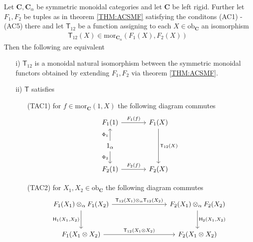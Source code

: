 \begin{thm}
\label{thm:appacmnt}
Let $\mathbf{C}, \mathbf{C}_{\alpha}$ be symmetric monoidal categories and let $\mathbf{C}$ be left rigid. Further let $F_{1},F_{2}$ be tuples as in theorem \ref{THM:ACSMF} satisfying the conditons (AC1) - (AC5) there and let $\mathsf{T}_{12}$ be a function assigning to each $X \in \mathrm{ob}_{\mathbf{C}}$ an isomorphism
\begin{align*}
  \mathsf{T}_{12}(X)
  \in
  \mathrm{mor}_{\mathbf{C}_{\alpha}}(F_{1}(X),F_{2}(X))
\end{align*}
Then the following are equivalent
\begin{enumerate}
\item[i)]
$\mathsf{T}_{12}$ is a monoidal natural isomorphism between the symmetric monoidal functors obtained by extending $F_{1},F_{2}$ via theorem \ref{THM:ACSMF}.

\item[ii)]
$\mathsf{T}$ satisfies
\begin{enumerate}
\item[(TAC1)]
for $f \in \mathrm{mor}_{\mathbf{C}}(1,X)$ the following diagram commutes
\begin{equation*}
\begin{tikzcd}[column sep=large]
  F_{1}(1)
  \ar{r}{F_{1}(f)}
  &
  F_{1}(X)
  \ar{dd}{\mathsf{T}_{12}(X)}
  \\
  1_{\alpha}
  \ar{u}{\Phi_{1}}
  \ar{d}[swap]{\Phi_{2}}
  \\
  F_{2}(1)
  \ar{r}{F_{2}(f)}
  &
  F_{2}(X)
\end{tikzcd}
\end{equation*}

\item[(TAC2)]
for $X_{1},X_{2} \in \mathrm{ob}_{\mathbf{C}}$ the following diagram commutes
\begin{equation*}
\begin{tikzcd}[row sep=large,column sep=8em]
  F_{1}(X_{1})
  \otimes_{\alpha}
  F_{1}(X_{2})
  \arrow{r}{\mathsf{T}_{12}(X_{1}) \otimes_{\alpha} \mathsf{T}_{12}(X_{2})}
  \arrow[swap]{d}{\mathsf{H}_{1}(X_{1},X_{2})}
  &
  F_{2}(X_{1})
  \otimes_{\alpha}
  F_{2}(X_{2})
  \arrow{d}{\mathsf{H}_{2}(X_{1},X_{2})}
  \\
  F_{1}(X_{1} \otimes X_{2})
  \arrow{r}{\mathsf{T}_{12}(X_{1} \otimes X_{2})}
  &
  F_{2}(X_{1} \otimes X_{2})
\end{tikzcd}
\end{equation*}
\end{enumerate}
\end{enumerate}
\end{thm}
